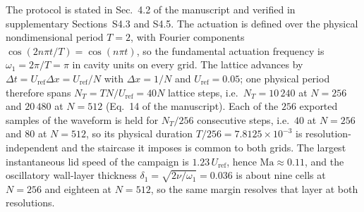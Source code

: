 \documentclass[11pt,a4paper]{article}
\begin{document}
The protocol is stated in Sec.~4.2 of the manuscript and verified in
supplementary Sections~S4.3 and S4.5. The actuation is defined over the physical
nondimensional period $T=2$, with Fourier components
$\cos(2n\pi t/T)=\cos(n\pi t)$, so the fundamental actuation frequency is
$\omega_1=2\pi/T=\pi$ in cavity units on every grid. The lattice advances by
$\Delta t=U_{\mathrm{ref}}\Delta x=U_{\mathrm{ref}}/N$ with $\Delta x=1/N$ and
$U_{\mathrm{ref}}=0.05$; one physical period therefore spans
$N_T=TN/U_{\mathrm{ref}}=40N$ lattice steps, i.e.\ $N_T=10\,240$ at $N=256$ and
$20\,480$ at $N=512$ (Eq.~14 of the manuscript). Each of the $256$ exported
samples of the waveform is held for $N_T/256$ consecutive steps, i.e.\ $40$ at
$N=256$ and $80$ at $N=512$, so its physical duration $T/256=7.8125\times10^{-3}$
is resolution-independent and the staircase it imposes is common to both grids.
The largest instantaneous lid speed of the campaign is $1.23\,U_{\mathrm{ref}}$,
hence $\mathrm{Ma}\approx0.11$, and the oscillatory wall-layer thickness
$\delta_1=\sqrt{2\nu/\omega_1}=0.036$ is about nine cells at $N=256$ and eighteen
at $N=512$, so the same margin resolves that layer at both resolutions.
\end{document}

